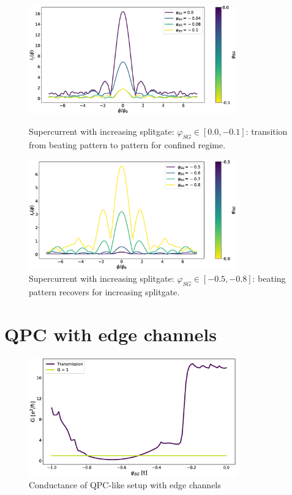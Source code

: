 \documentclass[a4paper]{article}
\begin{document}
\begin{figure}
\centering
\includegraphics[width=0.8\textwidth]{qpc-0-01}
\caption{Supercurrent with increasing splitgate: $\varphi_{SG} \in [0.0, -0.1]$: transition from beating pattern to pattern for confined regime.}
\includegraphics[width=0.8\textwidth]{qpc-05-08}
\caption{Supercurrent with increasing splitgate: $\varphi_{SG} \in [-0.5, -0.8]$: beating pattern recovers for increasing splitgate.}
\end{figure}

\newpage

\section{QPC with edge channels}

\begin{figure}[h!]
\centering
\includegraphics[width=0.8\textwidth]{qpc-edges-conductance}
\caption{Conductance of QPC-like setup with edge channels}
\end{figure}
\end{document}
